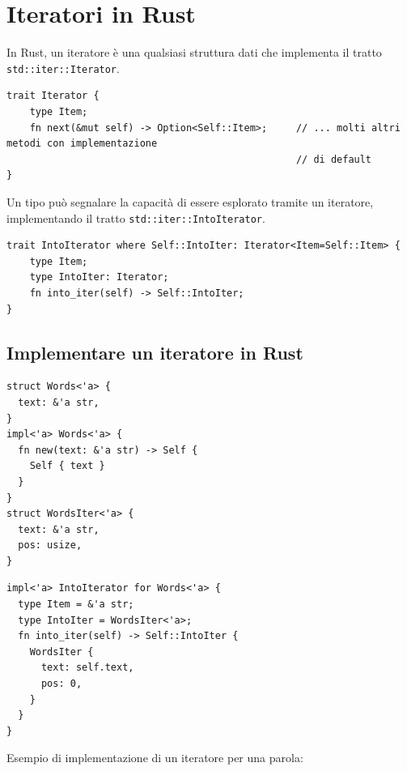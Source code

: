 \section{Iteratori in Rust}
In Rust, un iteratore è una qualsiasi struttura dati che implementa il tratto \verb|std::iter::Iterator|.

\begin{verbatim}
trait Iterator { 
    type Item; 
    fn next(&mut self) -> Option<Self::Item>;     // ... molti altri metodi con implementazione
                                                  // di default
} 
\end{verbatim}

Un tipo può segnalare la capacità di essere esplorato tramite un iteratore, implementando
il tratto \verb|std::iter::IntoIterator|.

\begin{verbatim}
trait IntoIterator where Self::IntoIter: Iterator<Item=Self::Item> { 
    type Item; 
    type IntoIter: Iterator; 
    fn into_iter(self) -> Self::IntoIter; 
} 
\end{verbatim}

\subsection{Implementare un iteratore in Rust}


\begin{center}
  \begin{minipage}{0.45\linewidth}
    \begin{verbatim}
struct Words<'a> {
  text: &'a str,
}
impl<'a> Words<'a> {
  fn new(text: &'a str) -> Self {
    Self { text }
  }
}
struct WordsIter<'a> {
  text: &'a str,
  pos: usize,
}
\end{verbatim}
  \end{minipage}%
  \hfill
  \begin{minipage}{0.45\linewidth}
    \begin{verbatim}
impl<'a> IntoIterator for Words<'a> {
  type Item = &'a str;
  type IntoIter = WordsIter<'a>;
  fn into_iter(self) -> Self::IntoIter {
    WordsIter {
      text: self.text,
      pos: 0,
    }
  }
}
\end{verbatim}
  \end{minipage}
\end{center}

Esempio di implementazione di un iteratore per una parola:


